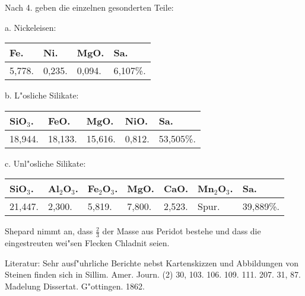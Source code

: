 \documentclass[a4paper, 11pt, oneside]{article}
\begin{document}
Nach 4. geben die einzelnen gesonderten Teile:

\begin{center}
a. Nickeleisen:
\end{center}

\begin{table}[H]
    \centering\swabfamily\Large
    \begin{tabular}{l l l l}
        Fe. & Ni. & MgO. & Sa. \\ \hline
        5,778. & 0,235. & 0,094. & 6,107\%. \\
    \end{tabular}
\end{table}

\begin{center}
b. L"osliche Silikate:
\end{center}

\begin{table}[H]
    \centering\swabfamily\Large
    \begin{tabular}{l l l l l}
        SiO$_{3}$. & FeO. & MgO. & NiO. & Sa. \\ \hline
        18,944. & 18,133. & 15,616. & 0,812. & 53,505\%. \\
    \end{tabular}
\end{table}

\begin{center}
c. Unl"osliche Silikate:
\end{center}

\begin{table}[H]
    \centering\swabfamily\Large
    \begin{tabular}{l l l l l l l}
        SiO$_{3}$. & Al$_{2}$O$_{3}$. & Fe$_{2}$O$_{3}$. & MgO. & CaO. & Mn$_{2}$O$_{3}$. & Sa. \\ \hline
        21,447. & 2,300. & 5,819. & 7,800. & 2,523. & Spur. & 39,889\%. \\
    \end{tabular}
\end{table}

Shepard nimmt an, dass $\mathfrak{\frac{2}{3}}$ der Masse aus Peridot bestehe und dass die eingestreuten wei"sen Flecken Chladnit seien.

\normalsize
Literatur: Sehr ausf"uhrliche Berichte nebst Kartenskizzen und Abbildungen von Steinen finden sich in Sillim. Amer. Journ. (2) 30, 103. 106. 109. 111. 207. 31, 87. Madelung Dissertat. G"ottingen. 1862.

\subsection{}
\LARGE
\end{document}
